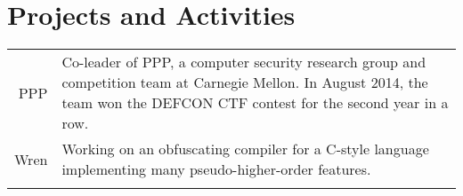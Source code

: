 \documentclass{article}
\begin{document}
\section{Projects and Activities}
\begin{tabular}{r|p{}}
PPP & \footnotesize{Co-leader of PPP, a computer security research group and competition team at
Carnegie Mellon. In August 2014, the team won the DEFCON CTF contest for the second year 
in a row.} \\
Wren & \footnotesize{Working on an obfuscating compiler for a C-style language implementing many pseudo-higher-order features.} \\
\multicolumn{2}{c}{}\\
\end{tabular}
\end{document}
